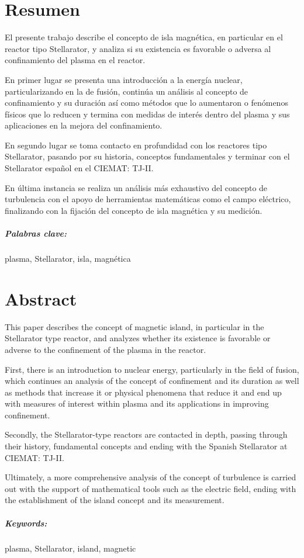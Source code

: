 \chapter*{Resumen}
El presente trabajo describe el concepto de isla magnética, en particular en el reactor tipo Stellarator, y analiza si su existencia es favorable o adversa
al confinamiento del plasma en el reactor.\par
En primer lugar se presenta una introducción a la energía nuclear, particularizando en la de fusión, continúa
un análisis al concepto de confinamiento y su duración así como métodos que lo aumentaron o fenómenos físicos que lo reducen y termina con medidas
de interés dentro del plasma y sus aplicaciones en la mejora del confinamiento.\par
En segundo lugar se toma contacto en profundidad con los reactores tipo Stellarator, pasando por su historia, 
conceptos fundamentales y terminar con el Stellarator español en el CIEMAT: TJ-II.\par
En última instancia se realiza un análisis más exhaustivo del concepto de turbulencia con el apoyo
de herramientas matemáticas como el campo eléctrico, finalizando con la fijación del concepto de isla
magnética y su medición.\par
\paragraph{Palabras clave:} plasma, Stellarator, isla, magnética
\chapter*{Abstract}
This paper describes the concept of magnetic island, in particular in the Stellarator type reactor, and 
analyzes whether its existence is favorable or adverse to the confinement of the plasma in the reactor.\par
First, there is an introduction to nuclear energy, particularly in the field of fusion, which continues 
an analysis of the concept of confinement and its duration as well as methods that increase it or physical 
phenomena that reduce it and end up with measures of interest within plasma and its applications in improving confinement.\par
Secondly, the Stellarator-type reactors are contacted in depth, passing through their history, 
fundamental concepts and ending with the Spanish Stellarator at CIEMAT: TJ-II.\par
Ultimately, a more comprehensive analysis of the concept of turbulence is carried out with the support
of mathematical tools such as the electric field, ending with the establishment of the island concept
and its measurement.\par
\paragraph{Keywords:} plasma, Stellarator, island, magnetic